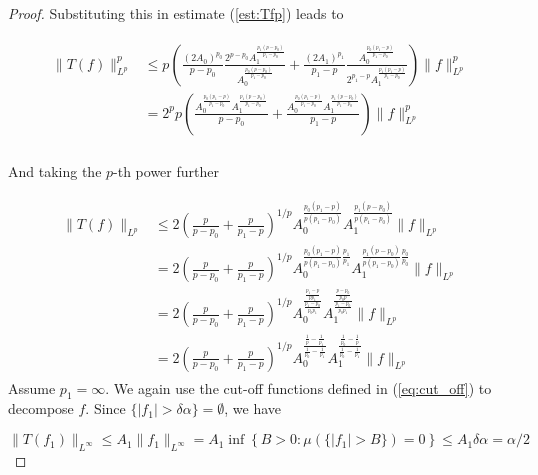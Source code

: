 \begin{proof}
		Substituting this in estimate (\ref{est:Tfp}) leads to

		\begin{gather}
			\begin{aligned}
				\|T(f)\|_{L^p}^p &\leqslant p\left( \frac{(2A_0)^{p_0}}{p - p_0}\frac{2^{p - p_0}A_1^\frac{p_1(p-p_0)}{p_1-p_0}}{A_0^\frac{p_0(p-p_0)}{p_1 - p_0}} + \frac{(2A_1)^{p_1}}{p_1 - p} \frac{A_0^\frac{p_0(p_1 - p)}{p_1 - p_0}}{2^{p_1 - p}A_1^\frac{p_1(p_1 - p)}{p_1 - p_0}} \right)\|f\|_{L^p}^p\\
				&=  2^pp\left( \frac{A_0^\frac{p_0(p_1 - p)}{p_1 - p_0}A_1^\frac{p_1(p-p_0)}{p_1-p_0}}{p - p_0} + \frac{A_0^\frac{p_0(p_1 - p)}{p_1 - p_0}A_1^\frac{p_1(p - p_0)}{p_1 - p_0}}{p_1- p} \right)\|f\|_{L^p}^p\\
			\end{aligned}
		\end{gather}

		And taking the $p$-th power further

		\begin{gather}
			\begin{aligned}
				\|T(f)\|_{L^p} &\leqslant 2\left( \frac{p}{p - p_0} + \frac{p}{p_1- p} \right)^{1/p} A_0^\frac{p_0(p_1 - p)}{p(p_1 - p_0)}A_1^\frac{p_1(p - p_0)}{p(p_1 - p_0)}\|f\|_{L^p}\\
				&= 2\left( \frac{p}{p - p_0} + \frac{p}{p_1- p} \right)^{1/p} A_0^{\frac{p_0(p_1 - p)}{p(p_1 - p_0)}\frac{p_1}{p_1}}A_1^{\frac{p_1(p - p_0)}{p(p_1 - p_0)}\frac{p_0}{p_0}}\|f\|_{L^p}\\
				&= 2\left( \frac{p}{p - p_0} + \frac{p}{p_1- p} \right)^{1/p} A_0^{\frac{\frac{p_1 - p}{pp_1}}{\frac{p_1 - p_0}{p_0p_1}}}A_1^{\frac{\frac{p - p_0}{p_0p}}{\frac{p_1 - p_0}{p_0p_1}}}\|f\|_{L^p}\\
				&= 2\left( \frac{p}{p - p_0} + \frac{p}{p_1- p} \right)^{1/p} A_0^{\frac{\frac{1}{p} - \frac{1}{p_1}}{\frac{1}{p_0} - \frac{1}{p_1}}}A_1^{\frac{\frac{1}{p_0} - \frac{1}{p}}{\frac{1}{p_0} - \frac{1}{p_1}}}\|f\|_{L^p}
			\end{aligned}
		\end{gather}
		Assume \underline{$p_1 = \infty$}. We again use the cut-off functions defined in (\ref{eq:cut_off}) to decompose $f$.  Since $\{\vert f_1\vert > \delta\alpha \} = \emptyset$, we have 

\begin{equation*}
	\|T(f_1)\|_{L^\infty} \leqslant A_1 \|f_1\|_{L^\infty} = A_1 \inf \left\{B > 0: \mu(\{\vert f_1 \vert > B\}) = 0 \right\} \leqslant A_1\delta\alpha = \alpha/2
\end{equation*}


\end{proof}
